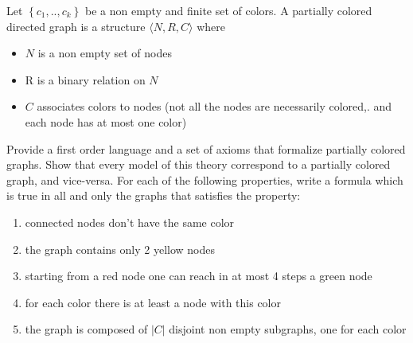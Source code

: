 
\begin{example} %
Let $\left\{c_{1}, . ., c_{k}\right\}$ be a non empty and finite set of colors. A partially colored directed graph is a structure $\langle N, R, C\rangle$ where

\begin{itemize}
  \item $N$ is a non empty set of nodes
  \item R is a binary relation on $N$
  \item $C$ associates colors to nodes (not all the nodes are necessarily colored,. and each node has at most one color)
\end{itemize}

Provide a first order language and a set of axioms that formalize partially colored graphs. Show that every model of this theory correspond to a partially colored graph, and vice-versa. For each of the following properties, write a formula which is true in all and only the graphs that satisfies the property:

\begin{enumerate}
  \item connected nodes don't have the same color
  \item the graph contains only 2 yellow nodes
  \item starting from a red node one can reach in at most 4 steps a green node
  \item for each color there is at least a node with this color
  \item the graph is composed of $|C|$ disjoint non empty subgraphs, one for each color
\end{enumerate}

\end{example}
